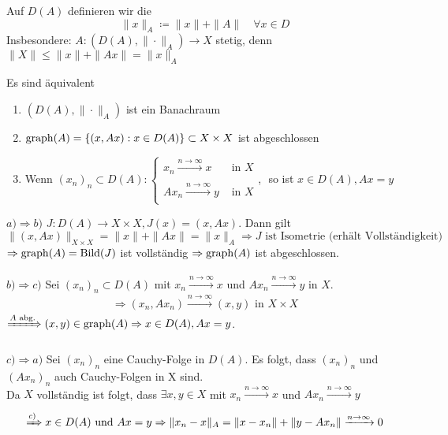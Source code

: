 \begin{definition}
	Auf $D(A)$ definieren wir die 
	\[ \| x \|_{A} \coloneqq \|x \| + \| A \| \quad \forall x \in D \]
	Insbesondere: $A: (D(A), \| \cdot \|_{A}) \rightarrow X$ stetig, denn $\| X \| \leq \|x \| + \| A x \| = \| x \|_{A}$
\end{definition}


\begin{satz} \label{satz:12.3}
	Es sind äquivalent
	\begin{enumerate}[label=\alph*\upshape)]
		\item $\left( D(A), \| \cdot \|_{A} \right)$ ist ein Banachraum
		\item $\operatorname{graph}(A) = \{ (x, A x): x \in D(A) \} \subset X \times X$ ist abgeschlossen
		\item Wenn $(x_{n})_{n} \subset D(A): \begin{cases}
			x_{n} \xrightarrow[]{n \rightarrow \infty} x & \text{ in } X \\ A x_{n} \xrightarrow[]{n \rightarrow \infty} y & \text{ in } X \end{cases}$, $ $ so ist $x \in D(A), A x = y$
	\end{enumerate}
\end{satz}

\begin{beweis}
	$a) \Rightarrow b)$ $J: D(A) \rightarrow X \times X, J(x) = (x, Ax)$. Dann gilt
		\[ \| (x, Ax) \|_{X \times X} = \| x \| + \| A x \| = \| x \|_{A} \Rightarrow J \text{ ist Isometrie (erhält Vollständigkeit)}  \]
		$\Rightarrow \operatorname{graph}(A) = \mathop{\rm Bild}\nolimits(J)$ ist vollständig $\Rightarrow \operatorname{graph}(A)$ ist abgeschlossen. \\ \\
	$b) \Rightarrow c)$ Sei $(x_{n})_{n} \subset D(A)$ mit $x_{n} \xrightarrow[]{n \rightarrow \infty} x$ und $Ax_{n} \xrightarrow[]{n \rightarrow \infty} y$ in $X$.
		\[ \Rightarrow (x_{n}, A x_{n}) \xrightarrow[]{n \rightarrow \infty} (x, y) \text{ in } X \times X \]
		$\xRightarrow[]{A \text{ abg.}} (x, y) \in \operatorname{graph}(A) \Rightarrow x \in D(A), Ax = y$. \\ \\
	$c) \Rightarrow a)$ Sei $(x_{n})_{n}$ eine Cauchy-Folge in $D(A)$. Es folgt, dass $(x_{n})_{n}$ und $(A x_{n})_{n}$ auch Cauchy-Folgen in X sind. \\
	Da $X$ vollständig ist folgt, dass  $\exists x, y \in X$ mit $x_{n} \xrightarrow[]{n \rightarrow \infty} x$ und $A x_{n} \xrightarrow[]{n \rightarrow \infty} y$ \\
	\[ \xRightarrow[]{c)} x \in D(A) \text{ und } A x = y \Rightarrow \|x_{n} - x \|_{A} = \| x - x_{n} \| + \| y - A x_{n} \| \xrightarrow[]{n \rightarrow \infty} 0 \]
\end{beweis}


